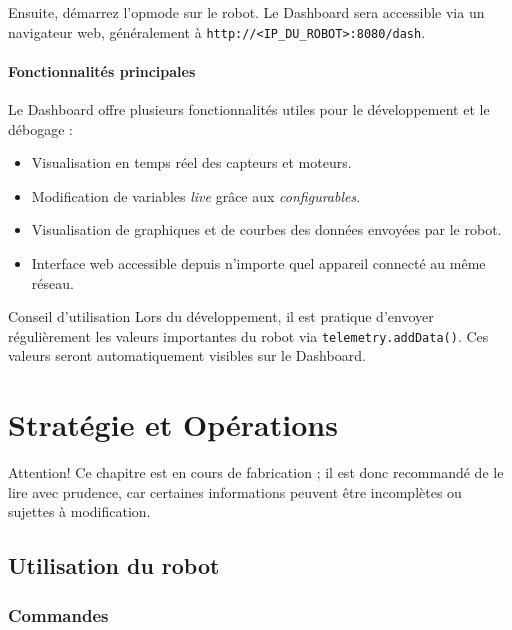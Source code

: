 \documentclass[12pt, a4paper]{report}
\begin{document}
    Ensuite, démarrez l’opmode sur le robot. Le Dashboard sera accessible via un navigateur web, généralement à \verb|http://<IP_DU_ROBOT>:8080/dash|.


    \subsubsection{Fonctionnalités principales}

    Le Dashboard offre plusieurs fonctionnalités utiles pour le développement et le débogage :

    \begin{itemize}
        \item Visualisation en temps réel des capteurs et moteurs.
        \item Modification de variables \textit{live} grâce aux \textit{configurables}.
        \item Visualisation de graphiques et de courbes des données envoyées par le robot.
        \item Interface web accessible depuis n’importe quel appareil connecté au même réseau.
    \end{itemize}

    \begin{myinfo}{Conseil d'utilisation}
        Lors du développement, il est pratique d’envoyer régulièrement les valeurs importantes du robot via \verb|telemetry.addData()|. Ces valeurs seront automatiquement visibles sur le Dashboard.
    \end{myinfo}


    \chapter{Stratégie et Opérations}

    \begin{myinfo}{Attention!}
        Ce chapitre est en cours de fabrication ; il est donc recommandé de le lire avec prudence,
        car certaines informations peuvent être incomplètes ou sujettes à modification.
    \end{myinfo}


    \section{Utilisation du robot}

    \subsection{Commandes}
\end{document}
